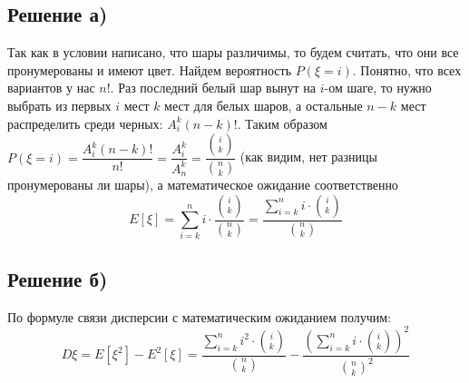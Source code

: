 \documentclass[a4paper, 12pt]{article}
\newcommand{\D}{\displaystyle}
\begin{document}
\begin{spacing}{1}
\subsection{Решение а)}
Так как в условии написано, что шары различимы, то будем считать, что они все пронумерованы и имеют цвет. Найдем вероятность $P(\xi = i)$. Понятно, что всех вариантов у нас $n!$. Раз последний белый шар вынут на $i$-ом шаге, то нужно выбрать из первых $i$ мест $k$ мест для белых шаров, а остальные $n - k$ мест распределить среди черных: $\D A_{i}^k (n-k)!$. Таким образом $\D P(\xi = i) = \dfrac{A_i^k(n-k)!}{n!}= \dfrac{A_i^k}{A_n^k} = \dfrac{\binom{i}{k}}{\binom{n}{k}}$ (как видим, нет разницы пронумерованы ли шары), а математическое ожидание соответственно
$$
E[\xi] = \sum\limits_{i = k}^n i \cdot \dfrac{\binom{i}{k}}{\binom{n}{k}} = \dfrac{\sum\limits_{i = k}^n i \cdot \binom{i}{k}}{\binom{n}{k}}
$$
\subsection{Решение б)} По формуле связи дисперсии с математическим ожиданием получим:
$$
D\xi = E[\xi^2] - E^2[\xi] = \dfrac{\sum\limits_{i = k}^n i^2 \cdot \binom{i}{k}}{\binom{n}{k}} - \dfrac{(\sum\limits_{i = k}^n i \cdot \binom{i}{k})^2}{\binom{n}{k}^2} 
$$
\end{spacing}
\end{document}
